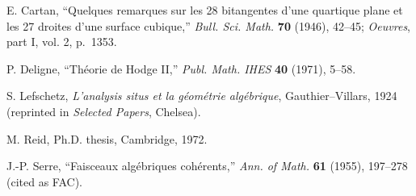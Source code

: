 \begin{enumerate}[label={[\arabic*]}]
\item E. Cartan, ``Quelques remarques sur les 28 bitangentes d'une quartique
  plane et les 27 droites d'une surface cubique,'' \emph{Bull. Sci. Math.}
  \textbf{70} (1946), 42--45; \emph{Oeuvres}, part I, vol. 2, p.~1353.
\item P. Deligne, ``Th\'eorie de Hodge II,'' \emph{Publ. Math. IHES}
  \textbf{40} (1971), 5--58.
\item S. Lefschetz, \emph{L'analysis situs et la g\'eom\'etrie alg\'ebrique},
  Gauthier--Villars, 1924 (reprinted in \emph{Selected Papers}, Chelsea).
\item M. Reid, Ph.D. thesis, Cambridge, 1972.
\item J.-P. Serre, ``Faisceaux alg\'ebriques coh\'erents,''
  \emph{Ann. of Math.} \textbf{61} (1955), 197--278 (cited as FAC).
\end{enumerate}

